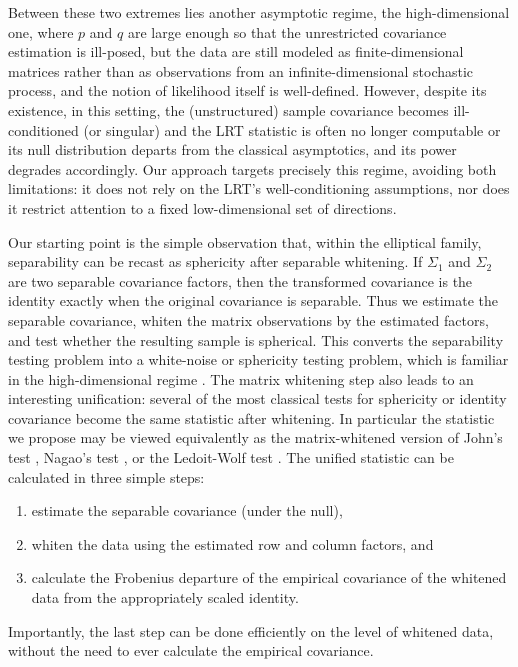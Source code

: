 \documentclass[12pt]{article}
\begin{document}
Between these two extremes lies another asymptotic regime, the high-dimensional one, where $p$ and $q$ are large enough so that the unrestricted covariance estimation is ill-posed, but the data are still modeled as finite-dimensional matrices rather than as observations from an infinite-dimensional stochastic process, and the notion of likelihood itself is well-defined. 
However, despite its existence, in this setting, the (unstructured) sample covariance becomes ill-conditioned (or singular) and the LRT statistic is often no longer computable or its null distribution departs from the classical asymptotics, and its power degrades accordingly.
Our approach targets precisely this regime, avoiding both limitations: it does not rely on the LRT's well-conditioning assumptions, nor does it restrict attention to a fixed low-dimensional set of directions.

Our starting point is the simple observation that, within the elliptical family, separability can be recast as sphericity after separable whitening. If $\Sigma_1$ and $\Sigma_2$ are two separable covariance factors, then the transformed covariance is the identity exactly when the original covariance is separable. Thus we estimate the separable covariance, whiten the matrix observations by the estimated factors, and test whether the resulting sample is spherical. This converts the separability testing problem into a white-noise or sphericity testing problem, which is familiar in the high-dimensional regime \citep{ledoit2002some,bai2009corrections,chen2010tests}. The matrix whitening step also leads to an interesting unification: several of the most classical tests for sphericity or identity covariance become the same statistic after whitening. In particular the statistic we propose may be viewed equivalently as the matrix-whitened version of John's test \citep{john1971some}, Nagao's test \citep{nagao1973some}, or the Ledoit-Wolf test \citep{ledoit2002some}. The unified statistic can be calculated in three simple steps:
\begin{enumerate}
    \item estimate the separable covariance (under the null),
    \item whiten the data using the estimated row and column factors, and
    \item calculate the Frobenius departure of the empirical covariance of the whitened data from the appropriately scaled identity.
\end{enumerate}
Importantly, the last step can be done efficiently on the level of whitened data, without the need to ever calculate the empirical covariance.
\end{document}
